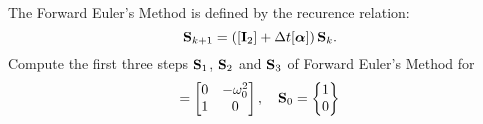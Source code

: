 \bexo
The Forward Euler's Method is defined by the recurence relation:
\begin{equation}
	\textbf{S}_{k+1}=\left(
	[\textbf{I}_2]+\Delta t[\boldsymbol{\alpha}]
	\right)\textbf{S}_k.
\end{equation}
Compute the first three steps $\textbf{S}_1$, $\textbf{S}_2$ and $\textbf{S}_3$ of Forward Euler's Method for 
\begin{equation}
	[\bs{\alpha}]=\begin{bmatrix}
		0 & -\omega_0^2 \\ 1 &0
	\end{bmatrix} \esp \tb{S}_0=\begin{Bmatrix}
		1\\0
	\end{Bmatrix}
\end{equation}
\eexo 






